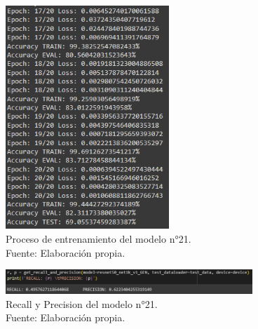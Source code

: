 \begin{figure}[H]
	\begin{center}
		\includegraphics[width=0.55\textwidth]{4/figures/model21_train.PNG}
		\caption[Proceso de entrenamiento del modelo n°21]{Proceso de entrenamiento del modelo n°21. \\
		Fuente: Elaboración propia.}
		\label{4:fig160}
	\end{center}
\end{figure}

\begin{figure}[H]
	\begin{center}
		\includegraphics[width=0.83\textwidth]{4/figures/model21_rp.PNG}
		\caption[Recall y Precision del modelo n°21]{Recall y Precision del modelo n°21. \\
		Fuente: Elaboración propia.}
		\label{4:fig161}
	\end{center}
\end{figure}

